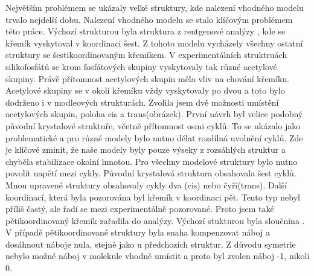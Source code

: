 \documentclass[
  digital, %
  table,   %
  lof,     %
  lot,     %
  oneside,
]{fithesis3}
\begin{document}
Největším problémem se ukázaly velké struktury, kde nalezení vhodného modelu trvalo nejdelší dobu. Nalezení vhodného modelu se stalo klíčovým problémem této práce.  Výchozí strukturou byla struktura z rentgenové analýzy \cite{C3NJ00721A}, kde se křemík vyskytoval v koordinaci šest. Z tohoto modelu vycházely všechny ostatní struktury se šestikoordinovaným křemíkem. V experimentálních struktruách silikofosfátů se krom fosfátových skupiny vyskytovaly tak různé acetylové skupiny. Právě přítomnost acetylových skupin měla vliv na chování křemíku. Acetylové skupiny  se v okolí křemíku vždy vyskytovaly po dvou a toto bylo dodrženo i v modleových strukturách. Zvolila jsem dvě možnosti umístění acetylových skupin, poloha cis a trans(obrázek). První návrh byl velice podobný původní krystalové struktuře, včetně přítomnost osmi cyklů. To se ukázalo jako problematické a pro různé modely bylo nutno dělat rozdílná uvolnění cyklů. Zde je klíčové zminit, že naše modely byly pouze výseky z rozsáhlých struktur a chyběla stabilizace okolní hmotou. Pro všechny modelové struktury bylo nutno povolít napětí mezi cykly. Původní krystalová struktura obsahovala šest cyklů. Mnou upravené struktury obsahovaly cykly dva (cis) nebo čyři(trans). Další koordinací, která byla pozorována byl křemík v koordinaci pět. Tento typ nebyl příliš častý, ale řadí se mezi experimentálně pozorované. Proto jsem také pětikoordinovaný křemík zařadila do analýzy. Výchozí stukturou byla sloučnina \cite{rtg_5}. V případě pětikoordinované struktury byla snaha kompenzovat náboj a dosáhnout náboje nula, stejně jako u předchozích struktur. Z důvodu symetrie nebylo možné náboj v molekule vhodně umístit a proto byl zvolen náboj -1, nikoli 0.
\end{document}
